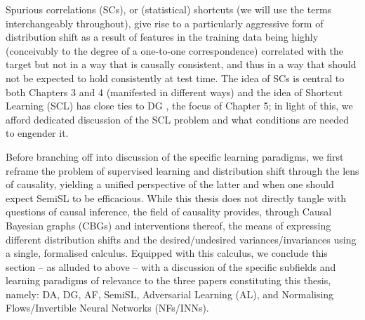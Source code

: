 %
Spurious correlations (SCs), or (statistical) shortcuts (we will use the terms interchangeably
throughout), give rise to a particularly aggressive form of distribution shift as a result of
features in the training data being highly (conceivably to the degree of a one-to-one
correspondence) correlated with the target but not in a way that is causally consistent, and thus
in a way that should not be expected to hold consistently at test time. 
%
The idea of SCs is central to both Chapters 3 and 4 (manifested in different ways) and the idea of
Shortcut Learning (SCL) has close ties to DG \citep{arjovsky2019invariant}, the focus of Chapter 5;
in light of this, we afford dedicated discussion of the SCL problem and what conditions are needed
to engender it.

%
Before branching off into discussion of the specific learning paradigms, we first reframe the
problem of supervised learning and distribution shift through the lens of causality, yielding a
unified perspective of the latter and when one should expect SemiSL to be efficacious.
%
While this thesis does not directly tangle with questions of causal inference, the field of
causality \citep{pearl2009causality} provides, through Causal Bayesian graphs (CBGs) and
interventions thereof, the means of expressing different distribution shifts and the
desired/undesired variances/invariances using a single, formalised calculus.
%
Equipped with this calculus, we conclude this section -- as alluded to above -- with a discussion
of the specific subfields and learning paradigms of relevance to the three papers constituting this
thesis, namely:  DA, DG, AF, SemiSL, Adversarial Learning (AL), and Normalising
Flows/Invertible Neural Networks (NFs/INNs).

